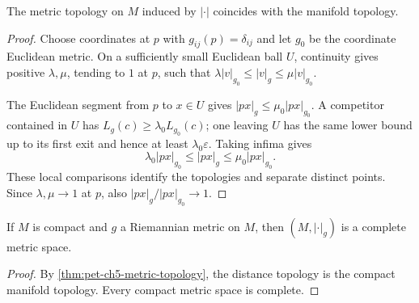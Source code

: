 \begin{theorem}
  \label{thm:pet-ch5-metric-topology}
  \leanok
  The metric topology on $M$ induced by $|\cdot|$ coincides with the manifold
  topology.
\end{theorem}
\begin{proof}
  \leanok
  \sketch
  Choose coordinates at $p$ with $g_{ij}(p)=\delta_{ij}$ and let $g_0$ be the
  coordinate Euclidean metric.  On a sufficiently small Euclidean ball $U$,
  continuity gives positive $\lambda,\mu$, tending to $1$ at $p$, such that
  $\lambda|v|_{g_0}\le|v|_g\le\mu|v|_{g_0}$.

  The Euclidean segment from $p$ to $x\in U$ gives
  $|px|_g\le\mu_0|px|_{g_0}$.  A competitor contained in $U$ has
  $L_g(c)\ge\lambda_0L_{g_0}(c)$; one leaving $U$ has the same lower bound up to
  its first exit and hence at least $\lambda_0\varepsilon$.  Taking infima gives
  \[
    \lambda_0|px|_{g_0}\le |px|_g\le\mu_0|px|_{g_0}.
  \]
  These local comparisons identify the topologies and separate distinct points.
  Since $\lambda,\mu\to1$ at $p$, also
  $|px|_g/|px|_{g_0}\to1$.
\end{proof}

\begin{corollary}
  \label{cor:pet-ch5-compact-complete-metric}
  \leanok
  If $M$ is compact and $g$ a Riemannian metric on $M$, then $(M,|\cdot|_g)$ is a
  complete metric space.
\end{corollary}
\begin{proof}
  \leanok
  \sketch
  By \cref{thm:pet-ch5-metric-topology}, the distance topology is the compact
  manifold topology.  Every compact metric space is complete.
\end{proof}

